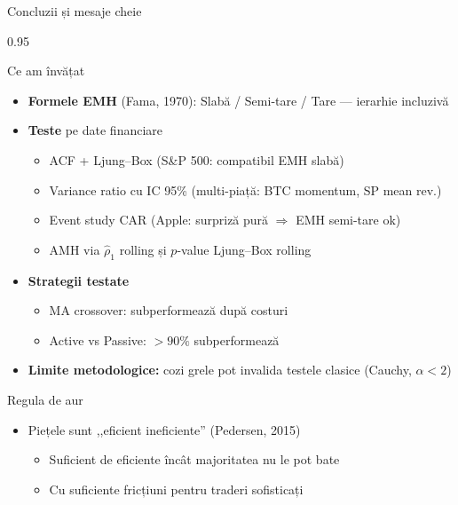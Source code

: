 \documentclass[9pt, aspectratio=169, t]{beamer}
\begin{document}
\begin{frame}[shrink=15]{Concluzii și mesaje cheie}
\begin{cminipage}{0.95\textwidth}
\begin{block}{Ce am învățat}
\begin{itemize}\setlength{\itemsep}{0pt}
    \item \textbf{Formele EMH} (Fama, 1970): Slabă / Semi-tare / Tare --- ierarhie incluzivă
    \item \textbf{Teste} pe date financiare
    \begin{itemize}\setlength{\itemsep}{0pt}
        \item ACF + Ljung--Box (S\&P 500: compatibil EMH slabă)
        \item Variance ratio cu IC 95\% (multi-piață: BTC momentum, SP mean rev.)
        \item Event study CAR (Apple: surpriză pură $\Rightarrow$ EMH semi-tare ok)
        \item AMH via $\hat\rho_1$ rolling și $p$-value Ljung--Box rolling
    \end{itemize}
    \item \textbf{Strategii testate}
    \begin{itemize}\setlength{\itemsep}{0pt}
        \item MA crossover: subperformează după costuri
        \item Active vs Passive: $>90\%$ subperformează
    \end{itemize}
    \item \textbf{Limite metodologice:} cozi grele pot invalida testele clasice (Cauchy, $\alpha < 2$)
\end{itemize}
\end{block}

\begin{alertblock}{Regula de aur}
\begin{itemize}\setlength{\itemsep}{0pt}
    \item Piețele sunt ,,eficient ineficiente'' (Pedersen, 2015)
    \begin{itemize}\setlength{\itemsep}{0pt}
        \item Suficient de eficiente încât majoritatea nu le pot bate
        \item Cu suficiente fricțiuni pentru traderi sofisticați
    \end{itemize}
\end{itemize}
\end{alertblock}
\end{cminipage}
\end{frame}
\end{document}
